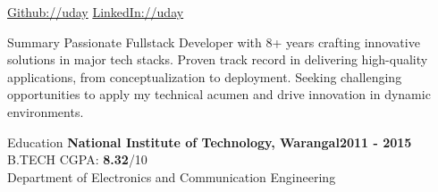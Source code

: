 \documentclass{resume} %
\begin{document}
\begingroup%
\hypersetup{urlcolor=blue}%
{\hspace{30ex}}\href{https://github.com/uday4393/}{Github://uday}%
{\hspace{5ex}}\href{https://www.linkedin.com/in/udaykumarmydam/}{LinkedIn://uday}%
\endgroup
\\
\begin{rSection}{Summary}
Passionate Fullstack Developer with 8+ years crafting innovative solutions in major tech stacks. Proven track record in delivering high-quality applications, from conceptualization to deployment. Seeking challenging opportunities to apply my technical acumen and drive innovation in dynamic environments.
\end{rSection}

\begin{rSection}{Education}
{\bf National Institute of Technology, Warangal}\hfill {\bf 2011 - 2015} 
\\B.TECH \hfill { CGPA: {\bf 8.32}/10}
\\ Department of Electronics and Communication Engineering \\
\end{rSection}


\end{document}
